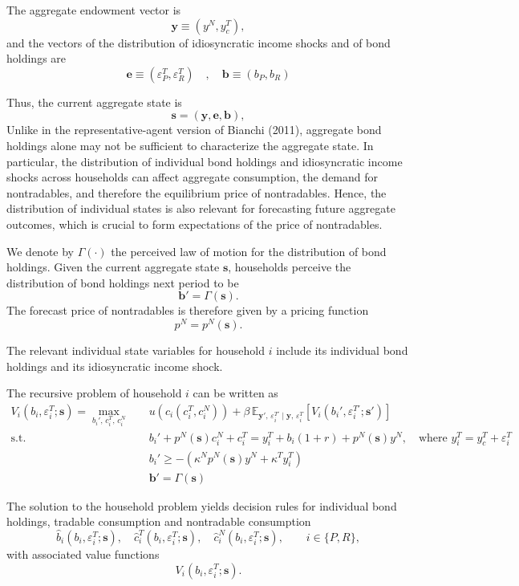 \documentclass[11pt]{article}
\begin{document}
The aggregate endowment vector is
$$\mathbf{y} \equiv (y^N,y_c^T),$$
and the vectors of the distribution of idiosyncratic income shocks and of bond holdings are
$$\mathbf{e}\equiv (\varepsilon_P^T,\varepsilon_R^T) \quad , \quad \mathbf{b} \equiv (b_P,b_R) $$

Thus, the current aggregate state is
\[
\mathbf{s}=\left(\mathbf{y},\mathbf{e},\mathbf{b}\right),
\]
Unlike in the representative-agent version of Bianchi (2011), aggregate
bond holdings alone may not be sufficient to characterize the aggregate
state. In particular, the distribution of individual bond holdings and
idiosyncratic income shocks across households can affect aggregate
consumption, the demand for nontradables, and therefore the equilibrium
price of nontradables. Hence, the distribution of individual states is
also relevant for forecasting future aggregate outcomes, which is crucial
to form expectations of the price of nontradables.

We denote by $\Gamma(\cdot)$ the perceived law of motion for the distribution of bond
holdings. Given the current aggregate state $\mathbf{s}$, households perceive the distribution of bond holdings next period to be
\[
\mathbf{b}'=\Gamma(\mathbf{s}).
\]
The forecast price of nontradables is therefore given by a pricing function
\[
p^N=p^N(\mathbf{s}).
\]

The relevant individual state variables for household $i$ include its
individual bond holdings and its idiosyncratic income shock.

The recursive problem of household $i$ can be written as
\begin{align*}
V_i(b_i,\varepsilon_i^T;\mathbf{s})
=
\max_{b_i',\,c_i^T,\,c_i^N} \quad & u\left(c_i(c_i^T,c_i^N)\right) +\beta \, 
\mathbb{E}_{\mathbf{y}',\,\varepsilon_i^{T\prime}\mid\mathbf{y},\,\varepsilon_i^T}\left[V_i\left(b_i',\varepsilon_i^{T\prime};\mathbf{s}'\right)\right] \\ 
\text{s.t.} \quad &b_i'+p^N(\mathbf{s})c_i^N+c_i^T=y_i^T+b_i(1+r)+p^N(\mathbf{s})y^N, \quad \text{where \ } y_i^T=y_c^T+\varepsilon_i^T \\ 
& b_i'\geq-\left(\kappa^N p^N(\mathbf{s})y^N+\kappa^T y_i^T\right) \\ 
& \mathbf{b}'=\Gamma(\mathbf{s})
\end{align*}


The solution to the household problem yields decision rules for individual
bond holdings, tradable consumption and nontradable consumption
\[
\widehat b_i(b_i,\varepsilon_i^T;\mathbf{s}), \quad 
\widehat c_i^T(b_i,\varepsilon_i^T;\mathbf{s}), \quad 
\widehat c_i^N(b_i,\varepsilon_i^T;\mathbf{s}),
\qquad
i\in\{P,R\},
\]
with associated value functions
\[
V_i(b_i,\varepsilon_i^T;\mathbf{s}).
\]
\end{document}
